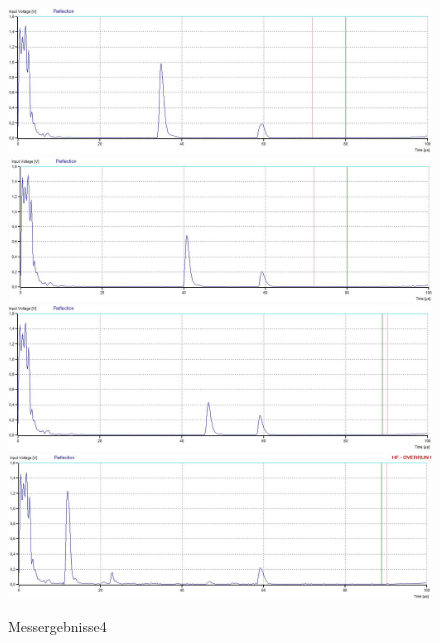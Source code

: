 \begin{figure}[H]
    \centering
    
\includegraphics[width=\textwidth]{messungen/quader/13.jpg}
\includegraphics[width=\textwidth]{messungen/quader/14.jpg}
\includegraphics[width=\textwidth]{messungen/quader/15.jpg}
\includegraphics[width=\textwidth]{messungen/quader/16.jpg}    
\caption{Messergebnisse4}
	
\end{figure}
